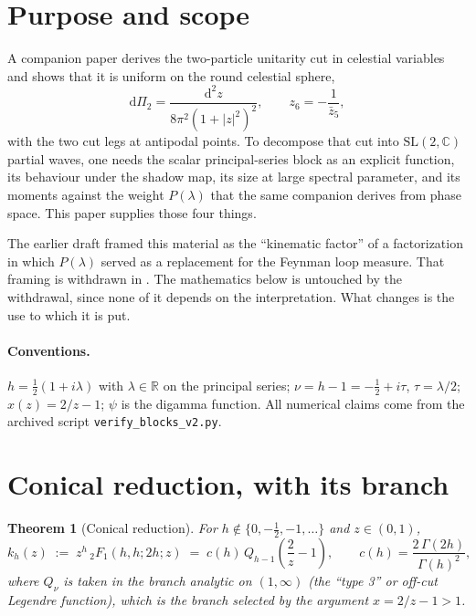 \documentclass[12pt,a4paper]{article}
\theoremstyle{plain}
\newtheorem{theorem}{Theorem}[section]
\theoremstyle{definition}
\theoremstyle{remark}
\newcommand{\R}{\mathbb{R}}
\newcommand{\C}{\mathbb{C}}
\newcommand{\dd}{\mathrm{d}}
\begin{document}
\section{Purpose and scope}

A companion paper \cite{ToupinLoops} derives the two-particle unitarity
cut in celestial variables and shows that it is uniform on the round
celestial sphere,
\begin{equation}
\dd\Pi_2=\frac{\dd^2z}{8\pi^2(1+|z|^2)^2},
\qquad
z_6=-\frac{1}{\bar z_5},
\label{eq:lips}
\end{equation}
with the two cut legs at antipodal points. To decompose that cut into
$\mathrm{SL}(2,\C)$ partial waves, one needs the scalar
principal-series block as an explicit function, its behaviour under the
shadow map, its size at large spectral parameter, and its moments
against the weight $P(\lambda)$ that the same companion derives from
phase space. This paper supplies those four things.

The earlier draft framed this material as the ``kinematic factor'' of a
factorization in which $P(\lambda)$ served as a replacement for the
Feynman loop measure. That framing is withdrawn in
\cite{ToupinSpectral}. The mathematics below is untouched by the
withdrawal, since none of it depends on the interpretation. What
changes is the use to which it is put.

\paragraph{Conventions.}
$h=\tfrac12(1+i\lambda)$ with $\lambda\in\R$ on the principal series;
$\nu=h-1=-\tfrac12+i\tau$, $\tau=\lambda/2$;
$x(z)=2/z-1$; $\psi$ is the digamma function. All numerical claims come
from the archived script \texttt{verify\_blocks\_v2.py}.

\section{Conical reduction, with its branch}

\begin{theorem}[Conical reduction]
\label{thm:conical}
For $h\notin\{0,-\tfrac12,-1,\dots\}$ and $z\in(0,1)$,
\begin{equation}
k_h(z)\;:=\;z^h\,{}_2F_1(h,h;2h;z)
\;=\;c(h)\,Q_{h-1}\!\left(\frac{2}{z}-1\right),
\qquad
c(h)=\frac{2\,\Gamma(2h)}{\Gamma(h)^2},
\label{eq:conical}
\end{equation}
where $Q_\nu$ is taken in the branch analytic on $(1,\infty)$ (the
``type 3'' or off-cut Legendre function), which is the branch selected
by the argument $x=2/z-1>1$.
\end{theorem}
\end{document}
